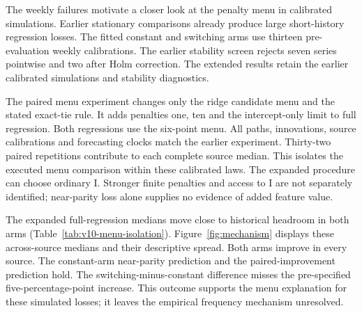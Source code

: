\documentclass[12pt,a4paper]{article}
\begin{document}
The weekly failures motivate a closer look at the penalty menu in calibrated simulations. Earlier stationary comparisons already produce large short-history regression losses. The fitted constant and switching arms use thirteen pre-evaluation weekly calibrations. The earlier stability screen rejects seven series pointwise and two after Holm correction. The extended results retain the earlier calibrated simulations and stability diagnostics.

The paired menu experiment changes only the ridge candidate menu and the stated exact-tie rule. It adds penalties one, ten and the intercept-only limit to full regression. Both regressions use the six-point menu. All paths, innovations, source calibrations and forecasting clocks match the earlier experiment. Thirty-two paired repetitions contribute to each complete source median. This isolates the executed menu comparison within these calibrated laws. The expanded procedure can choose ordinary I. Stronger finite penalties and access to I are not separately identified; near-parity loss alone supplies no evidence of added feature value.

The expanded full-regression medians move close to historical headroom in both arms (Table~\ref{tab:v10-menu-isolation}). Figure~\ref{fig:mechanism} displays these across-source medians and their descriptive spread. Both arms improve in every source. The constant-arm near-parity prediction and the paired-improvement prediction hold. The switching-minus-constant difference misses the pre-specified five-percentage-point increase. This outcome supports the menu explanation for these simulated losses; it leaves the empirical frequency mechanism unresolved.
\end{document}
